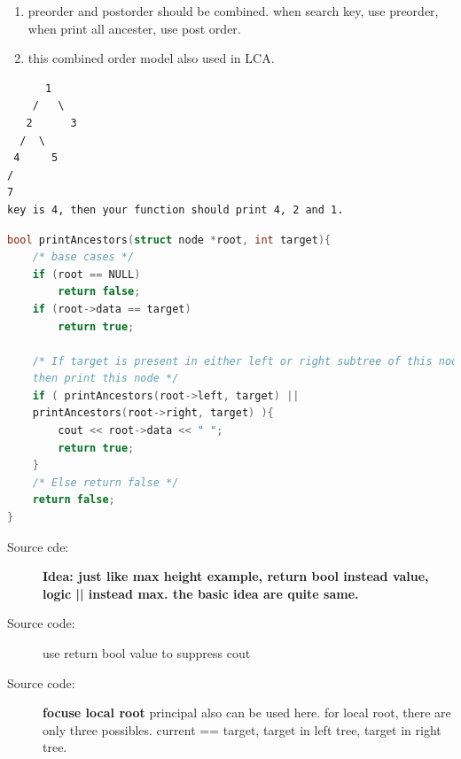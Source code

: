 \documentclass[a4paper,11pt,twoside]{book}
\begin{document}
\begin{itemize}
\begin{enumerate}
	\item preorder and postorder should be combined. when search key, use preorder, when print all ancester, use post order. 
	
	\item this combined order model also used in LCA.
\end{enumerate}
\begin{verbatim}
	  1
    /   \
   2      3
  /  \
 4     5
/
7
key is 4, then your function should print 4, 2 and 1.
\end{verbatim}

\begin{lstlisting}[frame=single, language=c++]
bool printAncestors(struct node *root, int target){
	/* base cases */
	if (root == NULL)
		return false;
	if (root->data == target)
		return true;
	
	/* If target is present in either left or right subtree of this node,
	then print this node */
	if ( printAncestors(root->left, target) ||
	printAncestors(root->right, target) ){
		cout << root->data << " ";
		return true;
	}
	/* Else return false */
	return false;
}	
\end{lstlisting}
\begin{description}
	\item[Source cde:] \textbf{Idea: just like max height example, return bool instead value, logic || instead max. the basic idea are quite same. }
	
	\item[Source code:] use return bool value to suppress cout
	
	\item[Source code:] \textbf{focuse local root} principal also can be used here. for local root, there are only three possibles.  current == target,  target in left tree, target in right tree.    
\end{description}

\end{itemize}
\end{document}
